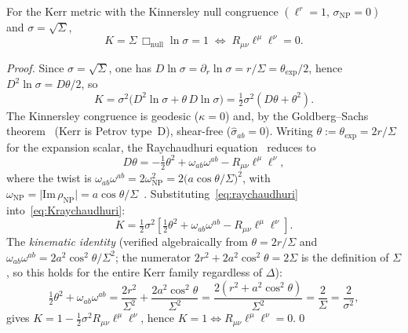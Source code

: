 \documentclass{iopart}
\begin{document}
\begin{proposition}[$K{=}1\Leftrightarrow R_{\mu\nu}\ell^\mu\ell^\nu=0$]
\label{prop:equiv}
For the Kerr metric with the Kinnersley null congruence
$(\ell^r=1,\,\sigma_{\scriptscriptstyle\mathrm{NP}}=0)$ and
$\sigma=\sqrt{\Sigma}$,
\[
  K=\Sigma\,\Box_{\mathrm{null}}\ln\sigma=1
  \;\Longleftrightarrow\;
  R_{\mu\nu}\ell^\mu\ell^\nu = 0.
\]
\end{proposition}

\begin{proof}
Since $\sigma=\sqrt{\Sigma}$, one has
$D\ln\sigma=\partial_r\ln\sigma=r/\Sigma=\theta_{\mathrm{exp}}/2$,
hence $D^2\ln\sigma=D\theta/2$, so
\begin{equation}\label{eq:Kraychaudhuri}
  K = \sigma^2\bigl(D^2\ln\sigma+\theta\,D\ln\sigma\bigr)
    = \tfrac{1}{2}\sigma^2(D\theta+\theta^2).
\end{equation}
The Kinnersley congruence is geodesic ($\kappa=0$) and, by
the Goldberg--Sachs theorem~\cite{GoldbergSachs1962}
(Kerr is Petrov type~D), shear-free
($\hat\sigma_{ab}=0$).
Writing $\theta:=\theta_{\mathrm{exp}}=2r/\Sigma$ for the
expansion scalar, the Raychaudhuri
equation~\cite{Raychaudhuri1955} reduces to
\begin{equation}\label{eq:raychaudhuri}
  D\theta = -\tfrac{1}{2}\theta^2
    + \omega_{ab}\omega^{ab}
    - R_{\mu\nu}\ell^\mu\ell^\nu,
\end{equation}
where the twist is
$\omega_{ab}\omega^{ab}=2\omega_{\scriptscriptstyle\mathrm{NP}}^2
=2\bigl(a\cos\theta/\Sigma\bigr)^2$,
with $\omega_{\scriptscriptstyle\mathrm{NP}}=\lvert\mathrm{Im}\,
\rho_{\scriptscriptstyle\mathrm{NP}}\rvert
=a\cos\theta/\Sigma$~\cite[Sec.~56]{Chandrasekhar1983}.
Substituting~\eqref{eq:raychaudhuri} into~\eqref{eq:Kraychaudhuri}:
\[
  K = \tfrac{1}{2}\sigma^2\!\left[
    \tfrac{1}{2}\theta^2+\omega_{ab}\omega^{ab}
    -R_{\mu\nu}\ell^\mu\ell^\nu\right].
\]
The \emph{kinematic identity} (verified algebraically
from $\theta=2r/\Sigma$ and $\omega_{ab}\omega^{ab}=2a^2\cos^2\!\theta/\Sigma^2$;
the numerator $2r^2+2a^2\cos^2\!\theta=2\Sigma$ is the definition of $\Sigma$,
so this holds for the entire Kerr family regardless of $\Delta$):
\begin{equation}\label{eq:kinematic}
  \tfrac{1}{2}\theta^2+\omega_{ab}\omega^{ab}
  = \frac{2r^2}{\Sigma^2}+\frac{2a^2\cos^2\!\theta}{\Sigma^2}
  = \frac{2(r^2+a^2\cos^2\!\theta)}{\Sigma^2}
  = \frac{2}{\Sigma}=\frac{2}{\sigma^2},
\end{equation}
gives $K=1-\tfrac{1}{2}\sigma^2 R_{\mu\nu}\ell^\mu\ell^\nu$,
hence $K=1\Leftrightarrow R_{\mu\nu}\ell^\mu\ell^\nu=0$.\qed
\end{proof}
\end{document}
